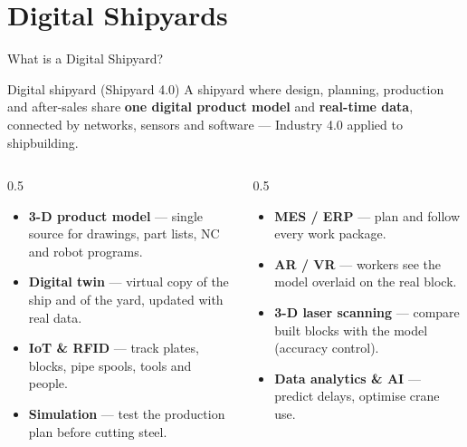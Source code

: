 \documentclass[aspectratio=169]{beamer}
\begin{document}
	\section{Digital Shipyards}
	\begin{frame}{What is a Digital Shipyard?}
		\begin{block}{Digital shipyard (Shipyard 4.0)}
			A shipyard where design, planning, production and after-sales share \textbf{one digital product model} and \textbf{real-time data}, connected by networks, sensors and software --- Industry 4.0 applied to shipbuilding.
		\end{block}
		\begin{columns}[T]
			\begin{column}{0.5\textwidth}
				\begin{itemize}\small
					\item \textbf{3-D product model} --- single source for drawings, part lists, NC and robot programs.
					\item \textbf{Digital twin} --- virtual copy of the ship and of the yard, updated with real data.
					\item \textbf{IoT \& RFID} --- track plates, blocks, pipe spools, tools and people.
					\item \textbf{Simulation} --- test the production plan before cutting steel.
				\end{itemize}
			\end{column}
			\begin{column}{0.5\textwidth}
				\begin{itemize}\small
					\item \textbf{MES / ERP} --- plan and follow every work package.
					\item \textbf{AR / VR} --- workers see the model overlaid on the real block.
					\item \textbf{3-D laser scanning} --- compare built blocks with the model (accuracy control).
					\item \textbf{Data analytics \& AI} --- predict delays, optimise crane use.
				\end{itemize}
			\end{column}
		\end{columns}
	\end{frame}
\end{document}
